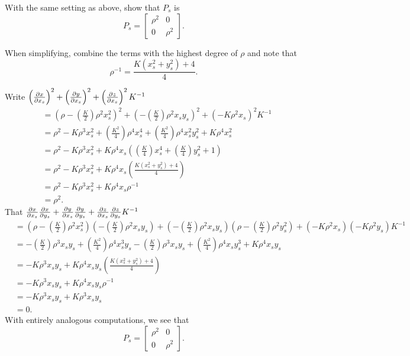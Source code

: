 \documentclass[newpage,hints,handout]{ximera}
\begin{document}
\begin{problem}
With the same setting as above, show that $P_s$ is
  \[
  P_s =
  \begin{bmatrix}
    \rho^2 & 0\\
    0 & \rho^2
  \end{bmatrix}.
  \]
  \begin{hint}
  When simplifying, combine the terms with the highest degree of $\rho$
  and note that
  \[
  \rho^{-1} = \frac{K\left(x_s^2 + y_s^2\right)+4}{4}.
  \]
\end{hint}
\begin{freeResponse}
  Write $\left(\pp[x]{x_s}\right)^2 + \left(\pp[y]{x_s}\right)^2 +\left(\pp[z]{x_s}\right)^2K^{-1}$
  \begin{align*}
    &=\left(\rho-\left(\frac{K}{2}\right)\rho^2x_s^2\right)^2 + \left(-\left(\frac{K}{2}\right)\rho^2x_sy_s\right)^2 +\left(-K\rho^2x_s\right)^2K^{-1}\\
    &=\rho^2 -K\rho^3x_s^2 + \left(\frac{K^2}{4}\right)\rho^4x_s^4 + \left(\frac{K^2}{4}\right)\rho^4x_s^2y_s^2 + K\rho^4x_s^2\\
    &=\rho^2 -K\rho^3x_s^2 + K\rho^4x_s\left(\left(\frac{K}{4}\right)x_s^4 + \left(\frac{K}{4}\right)y_s^2 + 1\right)\\
    &=\rho^2 -K\rho^3x_s^2 + K\rho^4x_s\left(\frac{K\left(x_s^2+y_s^2\right)+4}{4}\right)\\
    &=\rho^2 -K\rho^3x_s^2 + K\rho^4x_s\rho^{-1}\\
    &=\rho^2.
  \end{align*}
  That $\pp[x]{x_s}\pp[x]{y_s} + \pp[y]{x_s}\pp[y]{y_s} + \pp[z]{x_s}\pp[z]{y_s} K^{-1}$
  \begin{align*}
    &=\left(\rho-\left(\frac{K}{2}\right)\rho^2x_s^2\right)\left(-\left(\frac{K}{2}\right)\rho^2x_sy_s\right)
    + \left(-\left(\frac{K}{2}\right)\rho^2x_sy_s\right)\left(\rho-\left(\frac{K}{2}\right)\rho^2y_s^2\right)
    + \left(-K\rho^2x_s\right)\left(-K\rho^2y_s\right) K^{-1}\\
    &=
    -\left(\frac{K}{2}\right)\rho^3x_sy_s+\left(\frac{K^2}{4}\right)\rho^4x_s^3y_s
    -\left(\frac{K}{2}\right)\rho^3x_sy_s+\left(\frac{K^2}{4}\right)\rho^4x_sy_s^3
    + K\rho^4 x_sy_s\\
    &= -K\rho^3x_sy_s + K\rho^4x_sy_s\left(\frac{K\left(x_s^2+y_s^2\right)+4}{4}\right)\\
    &= -K\rho^3x_sy_s + K\rho^4x_sy_s\rho^{-1}\\
    &= -K\rho^3x_sy_s + K\rho^3x_sy_s\\
    &=0.
  \end{align*}
  With entirely analogous computations, we see that 
    \[
    P_s =
    \begin{bmatrix}
      \rho^2 & 0\\
      0 & \rho^2
    \end{bmatrix}.
    \]
\end{freeResponse}
\end{problem}
\end{document}
